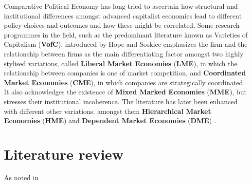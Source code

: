 \documentclass{article}
\begin{document}
\label{para:CPE}
    Comparative Political Economy has long tried to ascertain how structural and institutional differences amongst advanced capitalist economies lead to different policy choices and outcomes and how these might be correlated. Some research programmes in the field, such as the predominant literature known as Varieties of Capitalism (\textbf{VofC}), introduced by Hope and Soskice \autocite*{hall_introduction_2001} emphasizes the firm and the relationship between firms as the main differentiating factor amongst two highly stylised variations, called \textbf{Liberal Market Economies} (\textbf{LME}), in which the relationship between companies is one of market competition, and \textbf{Coordinated Market Economies} (\textbf{CME}), in which companies are strategically coordinated. It also acknowledges the existence of \textbf{Mixed Marked Economies} (\textbf{MME}), but stresses their institutional incoherence. The literature has later been enhanced with different other variations, amongst them  \textbf{Hierarchical Market Economies} (\textbf{HME}) \autocite{schneider_hierarchical_2009} and \textbf{Dependent Market Economies} (\textbf{DME}) \autocites{nolke_enlarging_2009}{ban_cocktail_2013}{soreg_patterns_2019}.



\section{Literature review}
As noted in \autocite{kruppe_labour_2014} \autocite{blanchard_hysteresis_1986}
\end{document}
